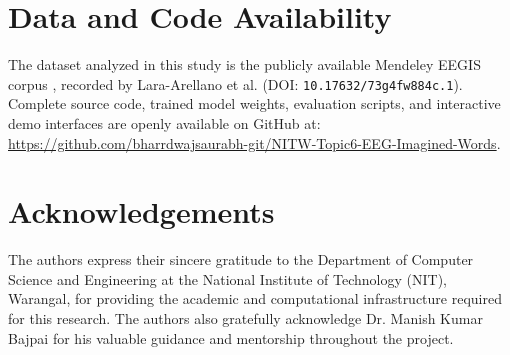 \documentclass[10pt,twocolumn,a4paper]{article}
\begin{document}
\section*{Data and Code Availability}
The dataset analyzed in this study is the publicly available Mendeley EEGIS corpus \cite{mendeley_eegis_2025}, recorded by Lara-Arellano et al. (DOI: \texttt{10.17632/73g4fw884c.1}). Complete source code, trained model weights, evaluation scripts, and interactive demo interfaces are openly available on GitHub at: \\
\url{https://github.com/bharrdwajsaurabh-git/NITW-Topic6-EEG-Imagined-Words}.

\section*{Acknowledgements}
The authors express their sincere gratitude to the Department of Computer Science and Engineering at the National Institute of Technology (NIT), Warangal, for providing the academic and computational infrastructure required for this research. The authors also gratefully acknowledge Dr. Manish Kumar Bajpai for his valuable guidance and mentorship throughout the project.
\end{document}
